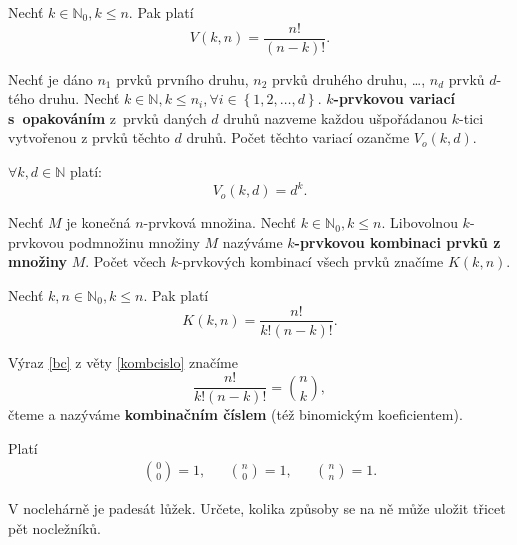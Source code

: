 \begin{veta}
    Nechť $k \in \mathbb N_0, k\leq n.$ Pak platí
    $$V(k,n)=\frac{n!}{(n-k)!}.$$
\end{veta}

\begin{definition}
    Nechť je dáno $n_1$ prvků prvního druhu, $n_2$ prvků druhého druhu, \dots,
    $n_d$ prvků $d$-tého druhu. Nechť $k\in \mathbb N, k \leq n_i, \forall
    i \in \left \{ 1, 2, \dots, d \right \} .$ \textbf{$k$-prvkovou variací s~opakováním}
    z~prvků daných $d$ druhů nazveme každou ušpořádanou $k$-tici
    vytvořenou z prvků těchto $d$ druhů. Počet těchto variací ozančme $V_o(k,d).$
\end{definition}

\begin{veta}
    $\forall k, d \in \mathbb N$ platí:
    $$V_o(k,d)=d^k.$$
\end{veta}

\begin{definition}
    Nechť $M$ je konečná $n$-prvková množina. Nechť $k \in \mathbb N_0, k\leq n.$
    Libovolnou $k$-prvkovou podmnožinu množiny $M$ nazýváme \textbf{$k$-prvkovou
    kombinaci prvků z množiny} $M$. Počet včech $k$-prvkových kombinací všech
    prvků značíme $K(k,n).$
\end{definition}

\begin{veta}\label{kombcislo}
    Nechť $k,n \in \mathbb N_0, k\leq n.$ Pak platí
    \begin{equation}\label{bc}
   K(k,n)=\frac{n!}{k!(n-k)!}.
    \end{equation}
\end{veta}

\begin{definition}
    Výraz \ref{bc} z věty \ref{kombcislo} značíme
    $$\frac{n!}{k!(n-k)!}=\binom{n}{k},$$
    čteme  a nazýváme \textbf{kombinačním číslem} (též binomickým
    koeficientem).
\end{definition}

\begin{pozn}
    Platí
    \begin{align*}
        \binom{0}{0}=1, & & \binom{n}{0}=1, & & \binom{n}{n} = 1.
    \end{align*}
\end{pozn}

\begin{priklad}
V noclehárně je padesát lůžek. Určete, kolika způsoby se na ně může uložit
třicet pět nocležníků.
\end{priklad}

